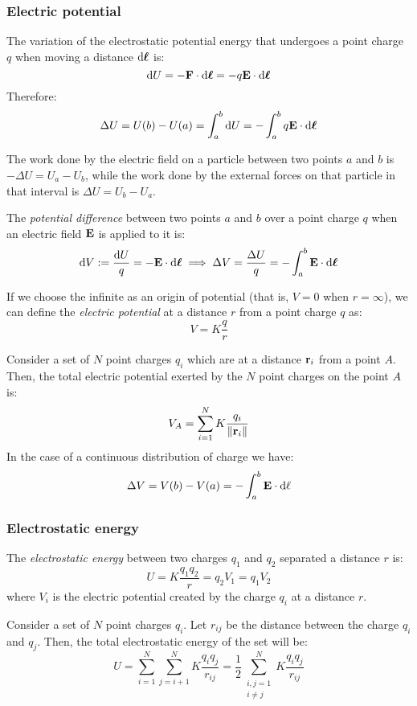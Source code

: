 \documentclass[../../../main.tex]{subfiles}
\begin{document}
\begin{multicols}{2}
    \subsubsection*{Electric potential}
    \begin{prop}
        The variation of the electrostatic potential energy that undergoes a point charge $q$ when moving a distance $\dd\vb*{\ell}$ is:
        $$\dd U=-\boldsymbol{\mathrm{F}}\cdot \dd\vb*{\ell}=-q\boldsymbol{\mathrm{E}}\cdot \dd\vb*{\ell}$$
        Therefore:
        $$\Delta U=U(b)-U(a)=\int_a^b\dd U=-\int_a^bq\boldsymbol{\mathrm{E}}\cdot \dd \vb*{\ell}$$
    \end{prop}
    \begin{prop}
        The work done by the electric field on a particle between two points $a$ and $b$ is $-\Delta U=U_a-U_b$, while the work done by the external forces on that particle in that interval is $\Delta U=U_b-U_a$.
    \end{prop}
    \begin{definition}
        The \textit{potential difference} between two points $a$ and $b$ over a point charge $q$ when an electric field $\boldsymbol{\mathrm{E}}$ is applied to it is:
        $$\dd V:=\frac{\dd U}{q}=-\boldsymbol{\mathrm{E}}\cdot\dd \vb*{\ell}\implies\Delta V=\frac{\Delta U}{q}=-\int_a^b\boldsymbol{\mathrm{E}}\cdot\dd \vb*{\ell}$$
    \end{definition}
    \begin{definition}
        If we choose the infinite as an origin of potential (that is, $V=0$ when $r=\infty$), we can define the \textit{electric potential} at a distance $r$ from a point charge $q$ as: $$V=K\frac{q}{r}$$
    \end{definition}
    \begin{principle}
        Consider a set of $N$ point charges $q_i$ which are at a distance $\boldsymbol{\mathrm{r}}_i$ from a point $A$. Then, the total electric potential exerted by the $N$ point charges on the point $A$ is:
        $$V_A=\sum_{i=1}^NK\frac{q_i}{\|\boldsymbol{\mathrm{r}}_{i}\|}$$
        In the case of a continuous distribution of charge we have:
        $$\Delta V=V(b)-V(a)=-\int_a^b\boldsymbol{\mathrm{E}}\cdot\dd\ell$$
    \end{principle}
    \subsubsection*{Electrostatic energy}
    \begin{definition}
        The \textit{electrostatic energy} between two charges $q_1$ and $q_2$ separated a distance $r$ is: $$U=K\frac{q_1q_2}{r}=q_2V_1=q_1V_2$$
        where $V_i$ is the electric potential created by the charge $q_i$ at a distance $r$.
    \end{definition}
    \begin{prop}
        Consider a set of $N$ point charges $q_i$. Let $r_{ij}$ be the distance between the charge $q_i$ and $q_j$. Then, the total electrostatic energy of the set will be: $$U=\sum_{i=1}^N\sum_{j=i+1}^NK\frac{q_iq_j}{r_{ij}}=\frac{1}{2}\sum_{\substack{i,j=1\\i\ne j}}^NK\frac{q_iq_j}{r_{ij}}$$
    \end{prop}

\end{multicols}
\end{document}
